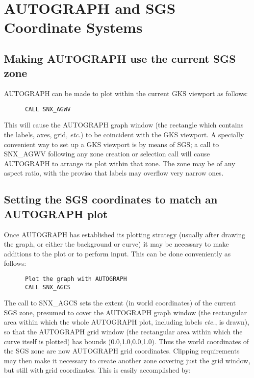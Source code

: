 \section {AUTOGRAPH and SGS Coordinate Systems} \label{coord_sect}

\subsection {Making AUTOGRAPH use the current SGS zone}

AUTOGRAPH can be made to plot within the current GKS viewport as follows:

\begin{verbatim}
      CALL SNX_AGWV
\end{verbatim}

This will cause the AUTOGRAPH graph window (the rectangle which
contains the labels, axes, grid, {\em etc.}) to be coincident with the GKS
viewport. A specially convenient way to set up a GKS viewport is by means of
SGS; a call to SNX\_AGWV following any zone creation or selection call will
cause AUTOGRAPH to arrange its plot within that zone.
The zone may be of any aspect ratio,
with the proviso that labels may overflow very narrow ones.


\subsection {Setting the SGS coordinates to match an AUTOGRAPH plot}

Once AUTOGRAPH has established its plotting strategy (usually
after drawing the graph, or either the background or curve) it
may be necessary to make additions to the plot or to perform input.
This can be done conveniently as follows:

\begin{verbatim}
      Plot the graph with AUTOGRAPH
      CALL SNX_AGCS
\end{verbatim}

The call to SNX\_AGCS sets the extent (in world coordinates) of the
current SGS zone, presumed to cover the AUTOGRAPH graph
window (the rectangular area within which the whole AUTOGRAPH
plot, including labels {\em etc.}, is drawn), so that the AUTOGRAPH
grid window (the rectangular
area within which the curve itself is plotted) has bounds
(0.0,1.0,0.0,1.0).
Thus the world coordinates of
the SGS zone are now AUTOGRAPH grid coordinates.
Clipping requirements may then make it necessary
to create another zone covering just the grid window, but
still with grid coordinates.
This is easily accomplished by:

